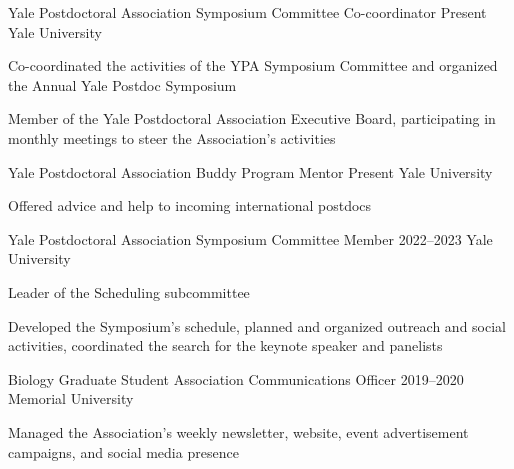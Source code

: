 \begin{cventries}

  \cventry
    {Yale Postdoctoral Association} %
    {Symposium Committee Co-coordinator} %
    {Present} %
    {Yale University} %
    {
      \begin{cvitems} %
        \item {Co-coordinated the activities of the YPA Symposium Committee and organized the Annual Yale Postdoc Symposium}
        \item {Member of the Yale Postdoctoral Association Executive Board, participating in monthly meetings to steer the Association's activities}
      \end{cvitems}
    }

  \cventry
    {Yale Postdoctoral Association} %
    {Buddy Program Mentor} %
    {Present} %
    {Yale University} %
    {
      \begin{cvitems} %
        \item {Offered advice and help to incoming international postdocs}
      \end{cvitems}
    }

  \cventry
    {Yale Postdoctoral Association} %
    {Symposium Committee Member} %
    {2022--2023} %
    {Yale University} %
    {
      \begin{cvitems} %
        \item {Leader of the Scheduling subcommittee}
        \item {Developed the Symposium's schedule, planned and organized outreach and social activities, coordinated the search for the keynote speaker and panelists}
      \end{cvitems}
    }

  \cventry
    {Biology Graduate Student Association} %
    {Communications Officer} %
    {2019--2020} %
    {Memorial University} %
    {
      \begin{cvitems} %
        \item {Managed the Association's weekly newsletter, website, event advertisement campaigns, and social media presence}
      \end{cvitems}
    }


\end{cventries}
